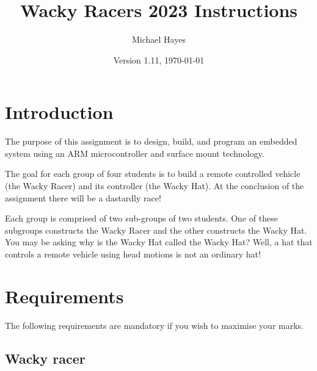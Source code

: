 \documentclass[11pt, a4paper]{article}
\title{Wacky Racers 2023 Instructions}
\author{Michael Hayes}
\date{Version 1.11, \today}
\begin{document}
\maketitle

\section{Introduction}

The purpose of this assignment is to design, build, and program an
embedded system using an ARM microcontroller and surface mount
technology.

The goal for each group of four students is to build a remote
controlled vehicle (the Wacky Racer) and its controller (the Wacky
Hat).  At the conclusion of the assignment there will be a dastardly race!

Each group is comprised of two sub-groups of two students.  One of
these subgroups constructs the Wacky Racer and the other constructs
the Wacky Hat.  You may be asking why is the Wacky Hat called the
Wacky Hat?  Well, a hat that controls a remote vehicle using head
motions is not an ordinary hat!


\section{Requirements}

The following requirements are mandatory if you wish to maximise your
marks.


\subsection{Wacky racer}
\end{document}
